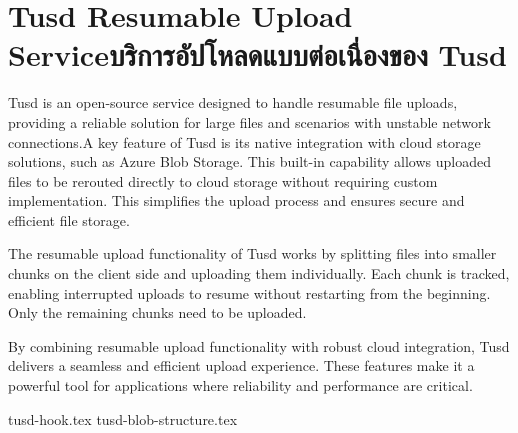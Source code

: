 \section{\ifenglish Tusd Resumable Upload Service\else บริการอัปโหลดแบบต่อเนื่องของ Tusd\fi}
Tusd is an open-source service designed to handle resumable file uploads, providing a reliable solution for large files and scenarios with unstable network connections.\enskip A key feature of Tusd is its native integration with cloud storage solutions, such as Azure Blob Storage. This built-in capability allows uploaded files to be rerouted directly to cloud storage without requiring custom implementation. This simplifies the upload process and ensures secure and efficient file storage.

The resumable upload functionality of Tusd works by splitting files into smaller chunks on the client side and uploading them individually. Each chunk is tracked, enabling interrupted uploads to resume without restarting from the beginning. Only the remaining chunks need to be uploaded.

By combining resumable upload functionality with robust cloud integration, Tusd delivers a seamless and efficient upload experience. These features make it a powerful tool for applications where reliability and performance are critical.

\newcommand{\tusdDir}{chapters/approach/tusd}
{tusd-hook.tex}
{tusd-blob-structure.tex}